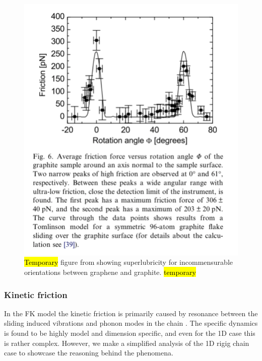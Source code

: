 \begin{figure}[H]
  \centering
  \includegraphics[width=0.5\linewidth]{figures/theory/graphene_rot.png}
  \caption{\hl{Temporary} figure from \cite{DIENWIEBEL2005197} showing superlubricity for incommensurable orientations between graphene and graphite. \hl{temporary}}
  \label{fig:graphene_rot}
\end{figure}




\subsubsection{Kinetic friction} %






In the \acrshort{FK} model the kinetic friction is primarily caused by resonance between
the sliding induced vibrations and phonon modes in the chain \cite{FK2D}. The specific dynamics is found to be highly model and dimension specific, and even for the 1D case this is rather complex. However, we make a simplified analysis of the 1D rigig chain case to showcase the reasoning behind the phenomena.

